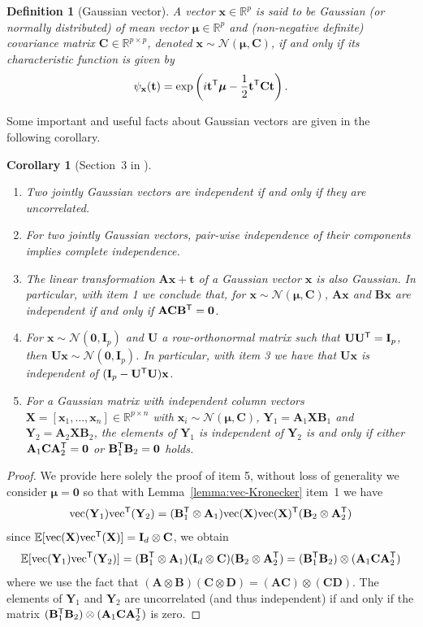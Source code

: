 \documentclass[MAL,biber]{nowfnt} %
\newtheorem{Corollary}{Corollary}
\newtheorem{Definition}{Definition}
\newcommand{\T}{{\sf T}}
\renewcommand{\vec}{{\rm vec}}
\newcommand{\A}{{\mathbf{A}}}
\newcommand{\B}{{\mathbf{B}}}
\newcommand{\C}{{\mathbf{C}}}
\newcommand{\D}{{\mathbf{D}}}
\newcommand{\I}{{\mathbf{I}}}
\newcommand{\U}{{\mathbf{U}}}
\newcommand{\X}{{\mathbf{X}}}
\newcommand{\Y}{{\mathbf{Y}}}
\renewcommand{\t}{{\mathbf{t}}}
\newcommand{\x}{{\mathbf{x}}}
\newcommand{\bmu}{{ \boldsymbol{\mu} }}
\newcommand{\zo}{{\mathbf{0}}}
\newcommand{\RR}{{\mathbb{R}}}
\newcommand{\EE}{{\mathbb{E}}}
\newcommand{\NN}{{\mathcal{N}}}
\begin{document}
\begin{Definition}[Gaussian vector]
A vector $\x \in \RR^p$ is said to be Gaussian (or normally distributed) of mean vector $\bmu \in \RR^p$ and (non-negative definite) covariance matrix $\C \in \RR^{p \times p}$, denoted $\x \sim \NN(\bmu, \C)$, if and only if its characteristic function is given by
\[
	\psi_\x(\t) = \exp \left( i \t^\T \bmu - \frac12 \t^\T \C \t \right).
\]
\end{Definition}
Some important and useful facts about Gaussian vectors are given in the following corollary.
\begin{Corollary}[Section~3 in \citep{mardia1979multivariate}]\label{coro:Gaussian-vec}
\begin{enumerate}
	\item Two jointly Gaussian vectors are independent if and only if they are uncorrelated.
	\item For two jointly Gaussian vectors, pair-wise independence of their components implies complete independence.
	\item The linear transformation $\A \x + \t$ of a Gaussian vector $\x$ is also Gaussian. In particular, with item 1 we conclude that, for $\x \sim \NN(\bmu, \C)$, $\A\x$ and $\B\x$ are independent if and only if $\A \C \B^\T = \zo$.
	\item For $\x \sim \NN(\zo,\I_p)$ and $\U$ a row-orthonormal matrix such that $\U\U^\T = \I_p$, then $\U \x \sim \NN(\zo,\I_p)$. In particular, with item 3 we have that $\U\x$ is independent of $(\I_p - \U^\T \U)\x$.
	\item For a Gaussian matrix with independent column vectors $\X = [\x_1, \ldots, \x_n] \in \RR^{p \times n}$ with $\x_i \sim \NN(\bmu, \C)$, $\Y_1 = \A_1 \X \B_1$ and $\Y_2 = \A_2 \X \B_2$, the elements of $\Y_1$ is independent of $\Y_2$ is and only if either $\A_1 \C \A_2^\T = \zo$ or $\B_1^\T \B_2 = \zo$ holds.
\end{enumerate}
\end{Corollary}
\begin{proof}
We provide here solely the proof of item 5, without loss of generality we consider $\bmu = \zo$ so that with Lemma~\ref{lemma:vec-Kronecker} item~1 we have 
\[
	\vec(\Y_1) \vec^\T(\Y_2) = (\B_1^\T \otimes \A_1) \vec(\X) \vec(\X)^\T (\B_2 \otimes \A_2^\T)
\]
since $\EE[\vec(\X) \vec^\T(\X)] = \I_d \otimes \C$, we obtain
\[
	\EE[\vec(\Y_1) \vec^\T(\Y_2)] = (\B_1^\T \otimes \A_1) (\I_d \otimes \C) (\B_2 \otimes \A_2^\T) = (\B_1^\T \B_2) \otimes (\A_1 \C \A_2^\T)
\]
where we use the fact that $(\A \otimes \B) (\C \otimes \D) = (\A\C) \otimes (\C\D)$. The elements of $\Y_1$ and $\Y_2$ are uncorrelated (and thus independent) if and only if the matrix $(\B_1^\T \B_2) \otimes (\A_1 \C \A_2^\T)$ is zero.
\end{proof}
\end{document}
